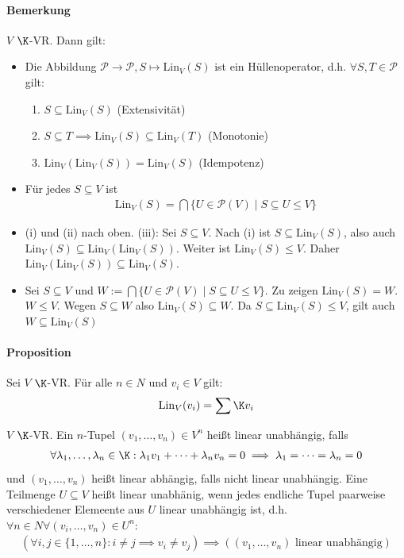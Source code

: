 \paragraph{Bemerkung} $V$ $\K$-VR. Dann gilt:
\begin{itemize}
	\item Die Abbildung $\mathcal{P}\to\mathcal{P}, S \mapsto \mathrm{Lin}_V(S)$ ist ein Hüllenoperator, d.h. $\forall S,T\in \mathcal{P}$ gilt:
	\begin{enumerate}
		\item $S\subseteq \mathrm{Lin}_V(S)$ (Extensivität)
		\item $S\subseteq T \implies \mathrm{Lin}_V(S)\subseteq\mathrm{Lin}_V(T)$ (Monotonie)
		\item $\mathrm{Lin}_V(\mathrm{Lin}_V(S))=\mathrm{Lin}_V(S)$ (Idempotenz)
	\end{enumerate}
	\item Für jedes $S\subseteq V$ ist
	\begin{align*}
		\mathrm{Lin}_V(S)=\bigcap \{U\in \mathcal{P}(V)\mid S\subseteq U \leq V\}
	\end{align*}
\end{itemize}
\prove 
\begin{itemize}
	\item (i) und (ii) nach oben. (iii): Sei $S\subseteq V$. Nach (i) ist $S\subseteq \mathrm{Lin}_V(S)$, also auch $\mathrm{Lin}_V(S)\subseteq \mathrm{Lin}_V(\mathrm{Lin}_V(S))$. Weiter ist $\mathrm{Lin}_V(S)\leq V$. Daher $\mathrm{Lin}_V(\mathrm{Lin}_V(S))\subseteq \mathrm{Lin}_V(S)$.
	\item Sei $S \subseteq V$ und $W:=\bigcap \{U\in \mathcal{P}(V)\mid S\subseteq U\leq V\}$. Zu zeigen $\mathrm{Lin}_V(S) = W$. $W\leq V$. Wegen $S\subseteq W$ also $\mathrm{Lin}_V(S)\subseteq W$. Da $S\subseteq \mathrm{Lin}_V(S)\leq V$, gilt auch $W\subseteq \mathrm{Lin}_V(S)$ 
\end{itemize}
\paragraph{Proposition} Sei $V$ $\K$-VR. Für alle $n\in N$ und $v_i\in V$ gilt:
\begin{align*}
	\mathrm{Lin}_V(v_i)=\sum\K v_i
\end{align*}
\begin{definition}
	$V$ $\K$-VR. Ein $n$-Tupel $(v_1,\dots, v_n)\in V^n$ heißt linear unabhängig, falls
	\begin{align*}
		\forall \lambda_1, \dots, \lambda_n \in \K: \lambda_1v_1+\dots +\lambda_nv_n=0\implies \lambda_1=\dots=\lambda_n =0
	\end{align*}
	und $(v_1, \dots, v_n)$ heißt linear abhängig, falls nicht linear unabhängig. Eine Teilmenge $U\subseteq V$ heißt linear unabhänig, wenn jedes endliche Tupel paarweise verschiedener Elemeente aus $U$ linear unabhängig ist, d.h. $\forall n \in N \forall (v_i, \dots, v_n)\in U^n$:
	\begin{align*}
		\left(\forall i,j\in \{1,\dots,n\}: i\neq j\implies v_i\neq v_j\right) \implies \left((v_1,\dots, v_n) \text{ linear unabhängig}\right)
	\end{align*}
\end{definition}
